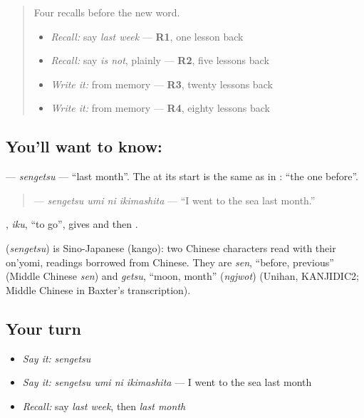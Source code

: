 \begin{quote}
Four recalls before the new word.

\begin{itemize}
\raggedright
  \item \emph{Recall:} say \emph{last week} — \textbf{R1}, one lesson back
  \item \emph{Recall:} say \emph{is not}, plainly — \textbf{R2}, five lessons back
  \item \emph{Write it:} \textbf{} from memory — \textbf{R3}, twenty lessons back
  \item \emph{Write it:} \textbf{} from memory — \textbf{R4}, eighty lessons back
\end{itemize}
\end{quote}

\subsection*{You'll want to know: }
\textbf{} — \emph{sengetsu} — \textquotedblleft{}last month\textquotedblright{}. The \textbf{} at its start is the same as in \textbf{}: \textquotedblleft{}the one before\textquotedblright{}.

\begin{quote}
\textbf{  } — \emph{sengetsu umi ni ikimashita} — \textquotedblleft{}I went to the sea last month.\textquotedblright{}
\end{quote}

\textbf{}, \emph{iku}, \textquotedblleft{}to go\textquotedblright{}, gives \textbf{} and then \textbf{}.

\begin{cousinweb}
\textbf{} (\emph{sengetsu}) is Sino-Japanese (kango): two Chinese characters read with their on'yomi, readings borrowed from Chinese. They are \emph{sen}, \textquotedblleft{}before, previous\textquotedblright{} (Middle Chinese \emph{sen}) and \emph{getsu}, \textquotedblleft{}moon, month\textquotedblright{} (\emph{ngjwot}) (Unihan, KANJIDIC2; Middle Chinese in Baxter's transcription).
\end{cousinweb}

\subsection*{Your turn}
\begin{itemize}
\raggedright
  \item \emph{Say it:} \emph{sengetsu}
  \item \emph{Say it:} \emph{sengetsu umi ni ikimashita} — I went to the sea last month
  \item \emph{Recall:} say \emph{last week}, then \emph{last month}
\end{itemize}

